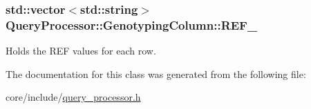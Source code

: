 \subsubsection[{R\+E\+F\+\_\+}]{\setlength{\rightskip}{0pt plus 5cm}std\+::vector$<$std\+::string$>$ Query\+Processor\+::\+Genotyping\+Column\+::\+R\+E\+F\+\_\+}\label{classQueryProcessor_1_1GenotypingColumn_a87123c6d37332b7a1bf9f711d40ca473}
Holds the R\+E\+F values for each row. 

The documentation for this class was generated from the following file\+:\begin{DoxyCompactItemize}
\item 
core/include/\hyperlink{query__processor_8h}{query\+\_\+processor.\+h}\end{DoxyCompactItemize}
